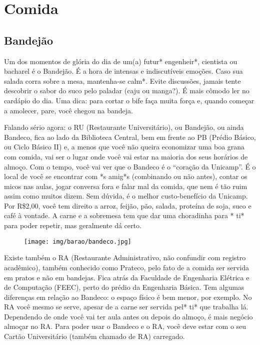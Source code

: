 
\section{Comida}
\subsection{Bandejão}

Um dos momentos de glória do dia de um(a) futur* engenheir*, cientista ou bacharel
é o Bandejão. É a hora de intensas e indiscutíveis emoções. Caso sua salada
corra sobre a mesa, mantenha-se calm*. Evite discussões, jamais tente descobrir
o sabor do suco pelo paladar (caju ou manga?). É mais cômodo ler no cardápio do
dia. Uma dica: para cortar o bife faça muita força e, quando começar a amolecer,
pare, você chegou na bandeja.

Falando sério agora: o RU (Restaurante Universitário), ou Bandejão, ou ainda
Bandeco, fica ao lado da Biblioteca Central, bem em frente ao PB (Prédio Básico,
ou Ciclo Básico II) e, a menos que você não queira economizar uma boa grana com
comida, vai ser o lugar onde você vai estar na maioria dos seus horários de
almoço. Com o tempo, você vai ver que o Bandeco é o ``coração da Unicamp''. É o
local de você se encontrar com *s amig*s (combinando ou não antes), contar os
micos nas aulas, jogar conversa fora e falar mal da comida, que nem é tão ruim
assim como muitos dizem. Sem dúvida, é o melhor custo-benefício da Unicamp. Por
R\$2,00, você tem direito a arroz, feijão, pão, salada, proteína de soja, suco e
café à vontade. A carne e a sobremesa tem que dar uma choradinha para * ti*
para poder repetir, mas geralmente dá certo.

\begin{figure}[h!]
    \centering
    \texttt{[image: img/barao/bandeco.jpg]}
\end{figure}

Existe também o RA (Restaurante Administrativo, não confundir com registro
acadêmico), também conhecido como Prateco, pelo fato de a comida ser servida em
pratos e não em bandejas. Fica atrás da Faculdade de Engenharia Elétrica e de
Computação (FEEC), perto do prédio da Engenharia Básica. Tem algumas diferenças
em relação ao Bandeco: o espaço físico é bem menor, por exemplo. No RA você
mesmo se serve, apesar de a carne ser servida pel* ti* que trabalha
lá. Dependendo de onde você vai ter aula antes ou depois do almoço, é mais
negócio almoçar no RA. Para poder usar o Bandeco e o RA, você deve estar com o
seu Cartão Universitário (também chamado de RA) carregado.

